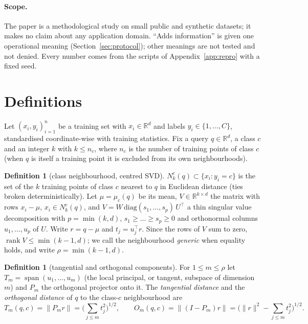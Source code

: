\documentclass[10pt,a4paper]{article}
\theoremstyle{plain}
\theoremstyle{definition}
\newtheorem{definition}[theorem]{Definition}
\theoremstyle{remark}
\newcommand{\R}{\mathbb{R}}
\newcommand{\Nk}{N_k^{c}(q)}
\begin{document}
\paragraph{Scope.} The paper is a methodological study on small public and synthetic datasets; it makes no claim about any application domain. ``Adds information'' is given one operational meaning (Section~\ref{sec:protocol}); other meanings are not tested and not denied. Every number comes from the scripts of Appendix~\ref{app:repro} with a fixed seed.

\section{Definitions}\label{sec:defs}

Let $(x_i,y_i)_{i=1}^n$ be a training set with $x_i\in\R^d$ and labels $y_i\in\{1,\dots,C\}$, standardised coordinate-wise with training statistics. Fix a query $q\in\R^d$, a class $c$ and an integer $k$ with $k\le n_c$, where $n_c$ is the number of training points of class $c$ (when $q$ is itself a training point it is excluded from its own neighbourhoods).

\begin{definition}[class neighbourhood, centred SVD]\label{def:nbhd}
$\Nk\subset\{x_i: y_i=c\}$ is the set of the $k$ training points of class $c$ nearest to $q$ in Euclidean distance (ties broken deterministically). Let $\mu=\mu_c(q)$ be its mean, $V\in\R^{k\times d}$ the matrix with rows $x_i-\mu$, $x_i\in\Nk$, and $V=W\,\mathrm{diag}(s_1,\dots,s_p)\,U^{\top}$ a thin singular value decomposition with $p=\min(k,d)$, $s_1\ge\dots\ge s_p\ge0$ and orthonormal columns $u_1,\dots,u_p$ of $U$. Write $r=q-\mu$ and $t_j=u_j^{\top}r$. Since the rows of $V$ sum to zero, $\operatorname{rank}V\le\min(k-1,d)$; we call the neighbourhood \emph{generic} when equality holds, and write $\rho=\min(k-1,d)$.
\end{definition}

\begin{definition}[tangential and orthogonal components]\label{def:TO}\sloppy
For $1\le m\le\rho$ let $T_m=\operatorname{span}(u_1,\dots,u_m)$ (the local principal, or tangent, subspace of dimension $m$) and $P_m$ the orthogonal projector onto it. The \emph{tangential distance} and the \emph{orthogonal distance} of $q$ to the class-$c$ neighbourhood are
\[
T_m(q,c)=\|P_m r\|=\Big(\sum_{j\le m}t_j^2\Big)^{1/2},\qquad
O_m(q,c)=\|(I-P_m)r\|=\Big(\|r\|^2-\sum_{j\le m}t_j^2\Big)^{1/2}.
\]
\end{definition}
\end{document}
